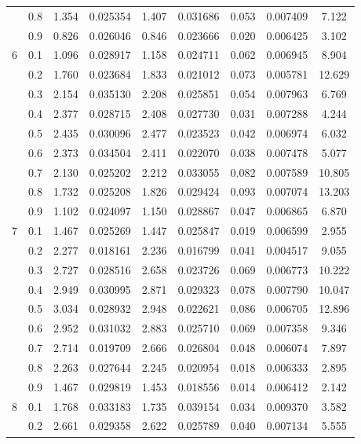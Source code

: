 \begin{longtable}{ | c | c || c | c | c | c | c | c | c | }
 & 0.8 & 1.354 & 0.025354 & 1.407 & 0.031686 & 0.053 & 0.007409 & 7.122 \\
 & 0.9 & 0.826 & 0.026046 & 0.846 & 0.023666 & 0.020 & 0.006425 & 3.102 \\
 \hline
\multirow{9}{*}{6} & 0.1 & 1.096 & 0.028917 & 1.158 & 0.024711 & 0.062 & 0.006945 & 8.904 \\
 & 0.2 & 1.760 & 0.023684 & 1.833 & 0.021012 & 0.073 & 0.005781 & 12.629 \\
 & 0.3 & 2.154 & 0.035130 & 2.208 & 0.025851 & 0.054 & 0.007963 & 6.769 \\
 & 0.4 & 2.377 & 0.028715 & 2.408 & 0.027730 & 0.031 & 0.007288 & 4.244 \\
 & 0.5 & 2.435 & 0.030096 & 2.477 & 0.023523 & 0.042 & 0.006974 & 6.032 \\
 & 0.6 & 2.373 & 0.034504 & 2.411 & 0.022070 & 0.038 & 0.007478 & 5.077 \\
 & 0.7 & 2.130 & 0.025202 & 2.212 & 0.033055 & 0.082 & 0.007589 & 10.805 \\
 & 0.8 & 1.732 & 0.025208 & 1.826 & 0.029424 & 0.093 & 0.007074 & 13.203 \\
 & 0.9 & 1.102 & 0.024097 & 1.150 & 0.028867 & 0.047 & 0.006865 & 6.870 \\
 \hline
\multirow{9}{*}{7} & 0.1 & 1.467 & 0.025269 & 1.447 & 0.025847 & 0.019 & 0.006599 & 2.955 \\
 & 0.2 & 2.277 & 0.018161 & 2.236 & 0.016799 & 0.041 & 0.004517 & 9.055 \\
 & 0.3 & 2.727 & 0.028516 & 2.658 & 0.023726 & 0.069 & 0.006773 & 10.222 \\
 & 0.4 & 2.949 & 0.030995 & 2.871 & 0.029323 & 0.078 & 0.007790 & 10.047 \\
 & 0.5 & 3.034 & 0.028932 & 2.948 & 0.022621 & 0.086 & 0.006705 & 12.896 \\
 & 0.6 & 2.952 & 0.031032 & 2.883 & 0.025710 & 0.069 & 0.007358 & 9.346 \\
 & 0.7 & 2.714 & 0.019709 & 2.666 & 0.026804 & 0.048 & 0.006074 & 7.897 \\
 & 0.8 & 2.263 & 0.027644 & 2.245 & 0.020954 & 0.018 & 0.006333 & 2.895 \\
 & 0.9 & 1.467 & 0.029819 & 1.453 & 0.018556 & 0.014 & 0.006412 & 2.142 \\
 \hline
\multirow{9}{*}{8} & 0.1 & 1.768 & 0.033183 & 1.735 & 0.039154 & 0.034 & 0.009370 & 3.582 \\
 & 0.2 & 2.661 & 0.029358 & 2.622 & 0.025789 & 0.040 & 0.007134 & 5.555 \\

\end{longtable}
